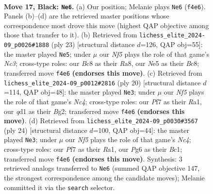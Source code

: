 \documentclass[11pt]{article}
\begin{document}
\begin{figure}[p]
\label{fig:thought-m31}
\end{figure}

\clearpage

\begin{figure}[p]\centering
\begin{subfigure}{0.46\textwidth}\centering
\resizebox{\linewidth}{!}{%
\newchessgame
\chessboard[
  setfen={r1b2kr1/1p1qbp1p/p5p1/2Ppn3/5n2/1N4N1/PPK2PPP/1RBQ1B1R b - - 3 17},
  showmover=false,
  pgfstyle=straightmove, color=movearrow, markmove={f4-e6}
]}
\caption{}
\end{subfigure}\hfill
\begin{subfigure}{0.46\textwidth}\centering
\resizebox{\linewidth}{!}{%
\newchessgame
\chessboard[
  setfen={r1bq1r1k/pp2p1bp/2np2p1/5n2/2P5/2N2B2/PPN2PPP/R1BQR1K1 b - - 5 12},
  showmover=false,
  pgfstyle=straightmove, color=movearrow, markmove={c6-e5}
]}
\caption{}
\end{subfigure}
\\[4pt]
\begin{subfigure}{0.46\textwidth}\centering
\resizebox{\linewidth}{!}{%
\newchessgame
\chessboard[
  setfen={r1bq1rk1/1p2ppbp/pn3np1/2p5/P1N5/2N3P1/1PPP1PBP/R1BQ1RK1 w - - 7 11},
  showmover=false,
  pgfstyle=straightmove, color=movearrow, markmove={c4-e3}
]}
\caption{}
\end{subfigure}\hfill
\begin{subfigure}{0.46\textwidth}\centering
\resizebox{\linewidth}{!}{%
\newchessgame
\chessboard[
  setfen={r1bq1rk1/ppb2ppp/1n3n2/3Pp3/2N5/2N3P1/PP3PBP/R1BQ1RK1 w - - 1 13},
  showmover=false,
  pgfstyle=straightmove, color=movearrow, markmove={c4-e3}
]}
\caption{}
\end{subfigure}
\caption{\textbf{Move 17, Black: \texttt{Ne6}.} (a) Our position; Melanie plays \texttt{Ne6} (\texttt{f4e6}). Panels (b)--(d) are the retrieved master positions whose correspondence most drove this move (highest QAP objective among those that transfer to it). (b) Retrieved from \texttt{lichess\_elite\_2024-09\_p0026\#1888} (ply 23) [structural distance $d$=126, QAP obj=55]: the master played \texttt{Ne5}; under $\mu$ our \emph{Nf5} plays the role of that game's \emph{Nc3}; cross-type roles: our \emph{B}c8 as their \emph{R}a8, our \emph{N}e5 as their \emph{B}c8; transferred move \texttt{f4e6} \textbf{(endorses this move)}. (c) Retrieved from \texttt{lichess\_elite\_2024-09\_p0012\#2816} (ply 20) [structural distance $d$=114, QAP obj=48]: the master played \texttt{Ne3}; under $\mu$ our \emph{Nf5} plays the role of that game's \emph{Nc4}; cross-type roles: our \emph{P}f7 as their \emph{R}a1, our \emph{q}d1 as their \emph{B}g2; transferred move \texttt{f4e6} \textbf{(endorses this move)}. (d) Retrieved from \texttt{lichess\_elite\_2024-09\_p0030\#3567} (ply 24) [structural distance $d$=100, QAP obj=44]: the master played \texttt{Ne3}; under $\mu$ our \emph{Nf5} plays the role of that game's \emph{Nc4}; cross-type roles: our \emph{P}f7 as their \emph{R}a1, our \emph{P}g6 as their \emph{B}c1; transferred move \texttt{f4e6} \textbf{(endorses this move)}. Synthesis: 3 retrieved analogs transferred to \texttt{Ne6} (summed QAP objective 147, the strongest correspondence among the candidate moves); Melanie committed it via the \texttt{search} selector.}

\end{figure}
\end{document}
